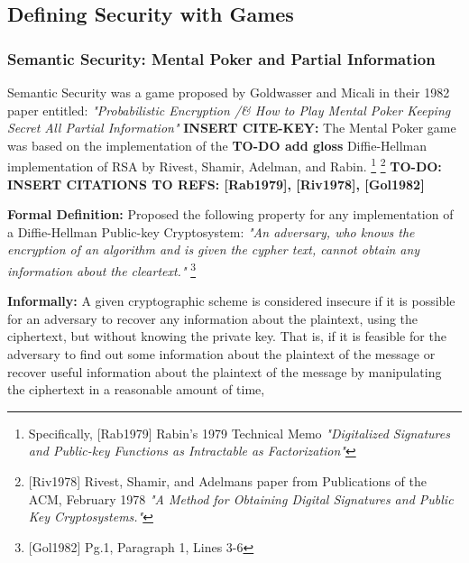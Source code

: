 \subsection{Defining Security with Games} 

\subsubsection{Semantic Security: Mental Poker and Partial Information} 

Semantic Security was a game proposed by Goldwasser and Micali in their 1982 paper entitled: \textit{"Probabilistic Encryption /& How to Play Mental Poker Keeping Secret All Partial Information"} 
\newline
\textbf{INSERT CITE-KEY:} 
\newline
The Mental Poker game was based on the implementation of the \textbf{TO-DO add gloss} Diffie-Hellman implementation of RSA by Rivest, Shamir, Adelman, and Rabin.
\footnote{Specifically, [Rab1979] Rabin's 1979 Technical Memo \textit{"Digitalized Signatures and Public-key Functions as Intractable as Factorization"}}
\footnote{[Riv1978] Rivest, Shamir, and Adelmans paper from Publications of the ACM, February 1978 \textit{"A Method for Obtaining Digital Signatures and Public Key Cryptosystems."}}
\textbf{TO-DO: INSERT CITATIONS TO REFS: [Rab1979], [Riv1978], [Gol1982]}

\textbf{Formal Definition:}
\newline
[Gol1982] Proposed the following property for any implementation of a Diffie-Hellman Public-key Cryptosystem:  \textit{"An adversary, who knows the encryption of an algorithm and is given the cypher text, cannot obtain any information about the cleartext."} \footnote{[Gol1982] Pg.1, Paragraph 1, Lines 3-6} 

\newline

\textbf{Informally:}
\newline
A given cryptographic scheme is considered insecure if it is possible for an adversary to recover any information about the plaintext, using the ciphertext, but without knowing the private key. That is, if it is feasible for the adversary to find out some information about the plaintext of the message or recover useful information about the plaintext of the message by manipulating the ciphertext in a reasonable amount of time, 

